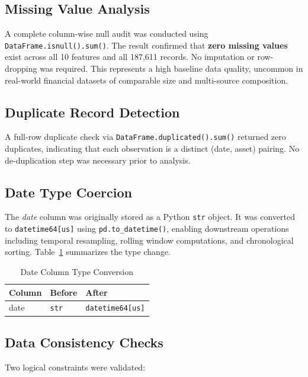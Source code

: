 \documentclass[10pt,a4paper,twocolumn]{article}
\begin{document}
\subsection{Missing Value Analysis}

A complete column-wise null audit was conducted using \texttt{DataFrame.isnull().sum()}. The result confirmed that \textbf{zero missing values} exist across all 10 features and all 187,611 records. No imputation or row-dropping was required. This represents a high baseline data quality, uncommon in real-world financial datasets of comparable size and multi-source composition.

\subsection{Duplicate Record Detection}

A full-row duplicate check via \texttt{DataFrame.duplicated().sum()} returned zero duplicates, indicating that each observation is a distinct (date, asset) pairing. No de-duplication step was necessary prior to analysis.

\subsection{Date Type Coercion}

The \textit{date} column was originally stored as a Python \texttt{str} object. It was converted to \texttt{datetime64[us]} using \texttt{pd.to\_datetime()}, enabling downstream operations including temporal resampling, rolling window computations, and chronological sorting. Table~\ref{tab:dtype_change} summarizes the type change.

\begin{table}[H]
\centering
\caption{Date Column Type Conversion}
\label{tab:dtype_change}
\small
\begin{tabular}{@{}lll@{}}
\toprule
\textbf{Column} & \textbf{Before} & \textbf{After} \\
\midrule
date & \texttt{str} & \texttt{datetime64[us]} \\
\bottomrule
\end{tabular}
\end{table}

\subsection{Data Consistency Checks}

Two logical constraints were validated:
\end{document}

